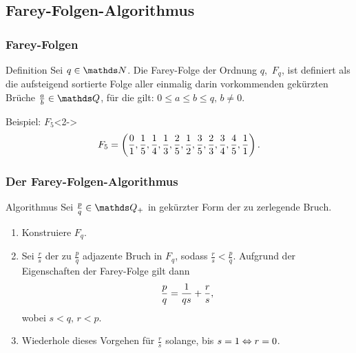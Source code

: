 \documentclass{beamer}
\begin{document}

\subsection{Farey-Folgen-Algorithmus}

\begin{frame}
\frametitle{Farey-Folgen}
	\begin{block}{Definition}
	Sei $q \in \N$. Die Farey-Folge der Ordnung $q$, $\, F_q$, ist definiert als die aufsteigend sortierte Folge aller einmalig darin vorkommenden gekürzten Brüche $\frac{a}{b} \in \Q$, für die gilt:
	$0\leq a \leq b \leq q,\, b\neq 0$.
	\end{block}
	\hspace{5cm}
	\begin{block}{Beispiel: $F_5$}<2->
		$$F_5 = \left(\frac{0}{1}, \frac{1}{5}, \frac{1}{4}, \frac{1}{3}, \frac{2}{5}, \frac{1}{2}, \frac{3}{5}, \frac{2}{3}, \frac{3}{4}, \frac{4}{5}, \frac{1}{1} \right).$$
	\end{block}
\end{frame}

\begin{frame}
	\frametitle{Der Farey-Folgen-Algorithmus}
	\begin{block}{Algorithmus}
		Sei $\frac{p}{q} \in \Q_+$ in gekürzter Form der zu zerlegende Bruch.\\
		\begin{enumerate}
			\item Konstruiere $F_q$.
			\item Sei $\frac{r}{s}$ der zu $\frac{p}{q}$ adjazente Bruch in $F_q$, sodass $\frac{r}{s} < \frac{p}{q}$. Aufgrund der Eigenschaften der Farey-Folge gilt dann
			$$\frac{p}{q} = \frac{1}{qs} + \frac{r}{s},$$ wobei $s<q,\, r<p$.
			\item Wiederhole dieses Vorgehen für $\frac{r}{s}$ solange, bis $s=1 \Leftrightarrow r=0$.
		\end{enumerate}
	\end{block}
\end{frame}
\end{document}
